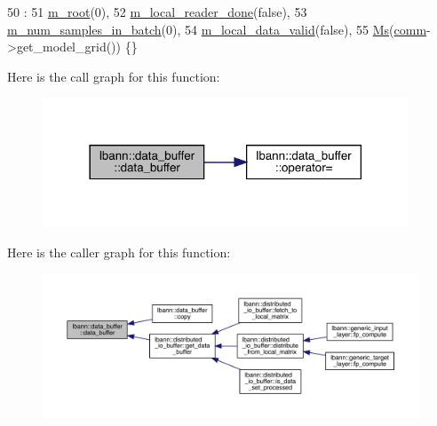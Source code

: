 \begin{DoxyCode}
50                                 :
51     \hyperlink{classlbann_1_1data__buffer_a5d2333dc0a74333b9d8ebfcc8084c783}{m\_root}(0),
52     \hyperlink{classlbann_1_1data__buffer_af83d8197ff61c85ab32a612480932a5b}{m\_local\_reader\_done}(\textcolor{keyword}{false}),
53     \hyperlink{classlbann_1_1data__buffer_a5f07c95c2fa99046df6d5437d1ef6375}{m\_num\_samples\_in\_batch}(0),
54     \hyperlink{classlbann_1_1data__buffer_ad0c2ff22428f74cf7c8eb4a2be534338}{m\_local\_data\_valid}(\textcolor{keyword}{false}),
55     \hyperlink{classlbann_1_1data__buffer_a9c9f68cda527896bc45762ddac7c2e2a}{Ms}(\hyperlink{file__io_8cpp_ab048c6f9fcbcfaa57ce68b00263dbebe}{comm}->get\_model\_grid()) \{\}
\end{DoxyCode}
Here is the call graph for this function\+:\nopagebreak
\begin{figure}[H]
\begin{center}
\leavevmode
\includegraphics[width=309pt]{classlbann_1_1data__buffer_ad03198df8b35ac6349180d5b2bc036d5_cgraph}
\end{center}
\end{figure}
Here is the caller graph for this function\+:\nopagebreak
\begin{figure}[H]
\begin{center}
\leavevmode
\includegraphics[width=350pt]{classlbann_1_1data__buffer_ad03198df8b35ac6349180d5b2bc036d5_icgraph}
\end{center}
\end{figure}
\mbox{\label{classlbann_1_1data__buffer_afdb150ed440864137d491685155a1d75}} 
